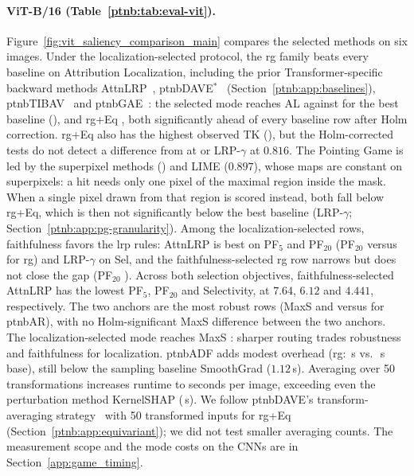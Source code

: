 \paragraph{ViT-B/16 (Table~\ref{ptnb:tab:eval-vit}).}
Figure~\ref{fig:vit_saliency_comparison_main} compares the selected methods on six images.
Under the localization-selected protocol, the \ac{rg} family beats every baseline on Attribution
Localization, including the prior Transformer-specific backward methods
AttnLRP~\parencite{Achtibat2024AttnLRP}, \acs{ptnbDAVE}$^{*}$~\parencite{Wrobel2024} (Section~\ref{ptnb:app:baselines}),
\ac{ptnbTIBAV}~\parencite{Chefer2021GenericAttention} and \ac{ptnbGAE}~\parencite{Chefer2021ICCV}: the selected mode
reaches AL \vitRGlocAL{} against \vitBestBaseAL{} for the best baseline (\vitBestBaseALname), and
\ac{rg}+Eq \vitRGEqlocAL{}, both significantly ahead of every baseline row after Holm correction.
\ac{rg}+Eq also has the highest observed TK (\vitRGEqlocTK{}), but the Holm-corrected tests do not detect a difference from \vitBestBaseTKname{}
at \vitBestBaseTK{} or LRP-$\gamma$ at $0.816$. The Pointing Game is led by the superpixel methods \vitBestBasePGname{} (\vitBestBasePG{}) and LIME ($0.897$), whose
maps are constant on superpixels: a hit needs only one pixel of the maximal region inside the mask.
When a single pixel drawn from that region is scored instead, both fall below \ac{rg}+Eq, which is
then not significantly below the best baseline (LRP-$\gamma$; Section~\ref{ptnb:app:pg-granularity}).
Among the localization-selected rows, faithfulness favors the \ac{lrp} rules: AttnLRP is best on PF$_5$ and PF$_{20}$ (PF$_{20}$ \vitBestBasePFtwenty{} versus \vitRGlocPFtwenty{} for \ac{rg}) and LRP-$\gamma$ on
Sel, and the
faithfulness-selected \ac{rg} row narrows but does not close the gap (PF$_{20}$
\vitRGfaithPFtwenty{}). Across both selection objectives, faithfulness-selected AttnLRP has the lowest PF$_5$, PF$_{20}$ and Selectivity, at $7.64$, $6.12$ and $4.441$, respectively. The two anchors are the most robust rows (MaxS \vitRGanchorMaxS{} and
\vitRGEqanchorMaxS{} versus \vitBestBaseMaxS{} for \ac{ptnbAR}), with no Holm-significant MaxS difference between the two anchors. The
localization-selected mode reaches MaxS \vitRGlocMaxS{}: sharper routing trades robustness and
faithfulness for localization. \ac{ptnbADF} adds modest overhead (\ac{rg}: \vitRGlocTime\,s vs.\
\vitRGanchorTime\,s base), still below the sampling baseline SmoothGrad ($1.12$\,s). Averaging over 50 transformations
increases runtime to \vitRGEqTime{} seconds per image, exceeding even the perturbation method
KernelSHAP (\vitSHAPTime\,s). We follow \ac{ptnbDAVE}'s transform-averaging strategy~\parencite{Wrobel2024} with 50 transformed inputs for \ac{rg}+Eq (Section~\ref{ptnb:app:equivariant}); we did not test smaller averaging counts. The measurement scope and the mode costs on the CNNs are in Section~\ref{app:game_timing}.

